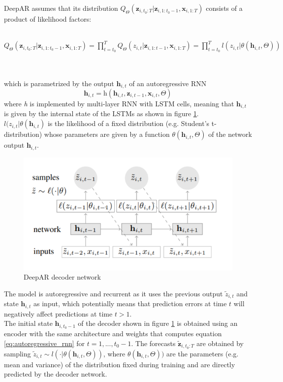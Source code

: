 \documentclass[a4paper]{article} %
\begin{document}
	DeepAR assumes that its distribution $Q_{\Theta}(\pmb{z}_{i, t_0:T} | \pmb{z}_{i, 1:t_0-1}, \pmb{x}_{i, 1:T})$ consists of a product of likelihood factors:\\\\
	\centerline{
	$
	Q_{\Theta}(\pmb{z}_{i, t_0:T} | \pmb{z}_{i, 1:t_0-1}, \pmb{x}_{i, 1:T}) 
	= \prod_{t=t_0}^{T} Q_{\Theta}(z_{i, t} | \pmb{z}_{i, 1:t-1}, \pmb{x}_{i, 1:T})
	= \prod_{t=t_0}^{T} \textit{l}(z_{i,t} | \theta(\pmb{h}_{i,t}, \Theta))
	$
	}\\\\
	which is parametrized by the output $\pmb{h}_{i,t}$ of an autoregressive RNN
	\begin{equation} \label{eq:autoregressive_rnn}
		\pmb{h}_{i,t} = \textit{h}(\pmb{h}_{i,t}, \pmb{z}_{i, t-1}, \pmb{x}_{i, t}, \Theta )
	\end{equation}
	where \textit{h} is implemented by multi-layer RNN with LSTM cells, meaning that $\pmb{h}_{i,t}$ is given by the internal state of the LSTMs as shown in figure \ref{fig:deepar}. \\
	$\textit{l}(z_{i,t} | \theta(\pmb{h}_{i,t})$ is the likelihood of a fixed distribution (e.g. Student's t-distribution) whose parameters are given by a function $\theta(\pmb{h}_{i,t}, \Theta)$ of the network output $\pmb{h}_{i,t}$.
	\begin{figure}
		\includegraphics[width=\linewidth]{img/deepar.png}
		\caption{DeepAR decoder network}
		\label{fig:deepar}
	\end{figure}
	The model is autoregressive and recurrent as it uses the previous output $\tilde{z}_{i,t}$ and state $\pmb{h}_{i,t}$ as input, which potentially means that prediction errors at time $t$ will negatively affect predictions at time $t>1$. \\
	The initial state $\pmb{h}_{i,t_0-1}$ of the decoder shown in figure \ref{fig:deepar} is obtained using an encoder with the same architecture and weights that computes equation \ref{eq:autoregressive_rnn} for $t = 1, ..., t_0-1$. The forecasts $\tilde{\pmb{z}}_{i, t_0:T}$ are obtained by sampling $\tilde{z}_{i,t} \sim l(\cdot | \theta(\pmb{h}_{i,t}, \Theta))$, where $\theta(\pmb{h}_{i,t}, \Theta))$ are the parameters (e.g. mean and variance) of the distribution fixed during training and are directly predicted by the decoder network.
	
\end{document}
